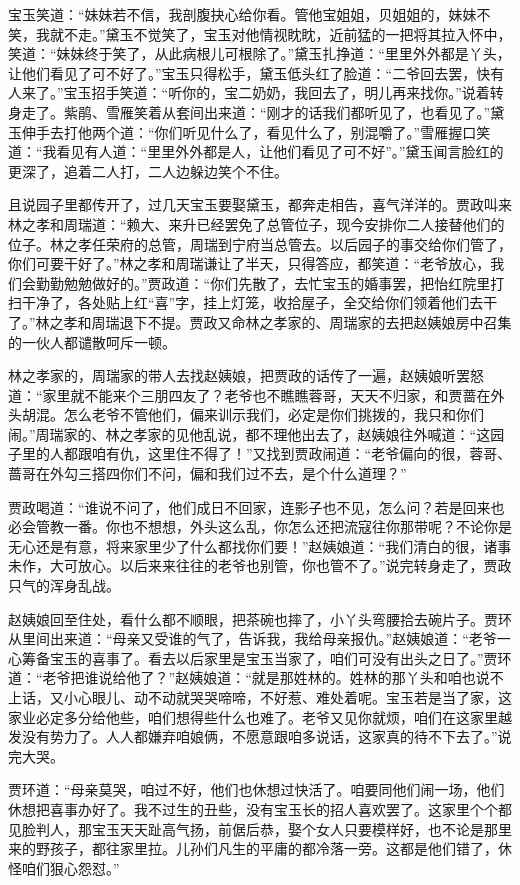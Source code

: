 \documentclass[12pt,oneside]{book}
\begin{document}
宝玉笑道：“妹妹若不信，我剖腹抉心给你看。管他宝姐姐，贝姐姐的，妹妹不笑，我就不走。”黛玉不觉笑了，宝玉对他情视眈眈，近前猛的一把将其拉入怀中，笑道：“妹妹终于笑了，从此病根儿可根除了。”黛玉扎挣道：“里里外外都是丫头，让他们看见了可不好了。”宝玉只得松手，黛玉低头红了脸道：“二爷回去罢，快有人来了。”宝玉招手笑道：“听你的，宝二奶奶，我回去了，明儿再来找你。”说着转身走了。紫鹃、雪雁笑着从套间出来道：“刚才的话我们都听见了，也看见了。”黛玉伸手去打他两个道：“你们听见什么了，看见什么了，别混嚼了。”雪雁握口笑道：“我看见有人道：“里里外外都是人，让他们看见了可不好”。”黛玉闻言脸红的更深了，追着二人打，二人边躲边笑个不住。

且说园子里都传开了，过几天宝玉要娶黛玉，都奔走相告，喜气洋洋的。贾政叫来林之孝和周瑞道：“赖大、来升已经罢免了总管位子，现今安排你二人接替他们的位子。林之孝任荣府的总管，周瑞到宁府当总管去。以后园子的事交给你们管了，你们可要干好了。”林之孝和周瑞谦让了半天，只得答应，都笑道：“老爷放心，我们会勤勤勉勉做好的。”贾政道：“你们先散了，去忙宝玉的婚事罢，把怡红院里打扫干净了，各处贴上红“喜”字，挂上灯笼，收拾屋子，全交给你们领着他们去干了。”林之孝和周瑞退下不提。贾政又命林之孝家的、周瑞家的去把赵姨娘房中召集的一伙人都谴散呵斥一顿。

林之孝家的，周瑞家的带人去找赵姨娘，把贾政的话传了一遍，赵姨娘听罢怒道：“家里就不能来个三朋四友了？老爷也不瞧瞧蓉哥，天天不归家，和贾蔷在外头胡混。怎么老爷不管他们，偏来训示我们，必定是你们挑拨的，我只和你们闹。”周瑞家的、林之孝家的见他乱说，都不理他出去了，赵姨娘往外喊道：“这园子里的人都跟咱有仇，这里住不得了！”又找到贾政闹道：“老爷偏向的很，蓉哥、蔷哥在外勾三搭四你们不问，偏和我们过不去，是个什么道理？”

贾政喝道：“谁说不问了，他们成日不回家，连影子也不见，怎么问？若是回来也必会管教一番。你也不想想，外头这么乱，你怎么还把流寇往你那带呢？不论你是无心还是有意，将来家里少了什么都找你们要！”赵姨娘道：“我们清白的很，诸事未作，大可放心。以后来来往往的老爷也别管，你也管不了。”说完转身走了，贾政只气的浑身乱战。

赵姨娘回至住处，看什么都不顺眼，把茶碗也摔了，小丫头弯腰拾去碗片子。贾环从里间出来道：“母亲又受谁的气了，告诉我，我给母亲报仇。”赵姨娘道：“老爷一心筹备宝玉的喜事了。看去以后家里是宝玉当家了，咱们可没有出头之日了。”贾环道：“老爷把谁说给他了？”赵姨娘道：“就是那姓林的。姓林的那丫头和咱也说不上话，又小心眼儿、动不动就哭哭啼啼，不好惹、难处着呢。宝玉若是当了家，这家业必定多分给他些，咱们想得些什么也难了。老爷又见你就烦，咱们在这家里越发没有势力了。人人都嫌弃咱娘俩，不愿意跟咱多说话，这家真的待不下去了。”说完大哭。

贾环道：“母亲莫哭，咱过不好，他们也休想过快活了。咱要同他们闹一场，他们休想把喜事办好了。我不过生的丑些，没有宝玉长的招人喜欢罢了。这家里个个都见脸判人，那宝玉天天趾高气扬，前倨后恭，娶个女人只要模样好，也不论是那里来的野孩子，都往家里拉。儿孙们凡生的平庸的都冷落一旁。这都是他们错了，休怪咱们狠心怨怼。”
\end{document}
